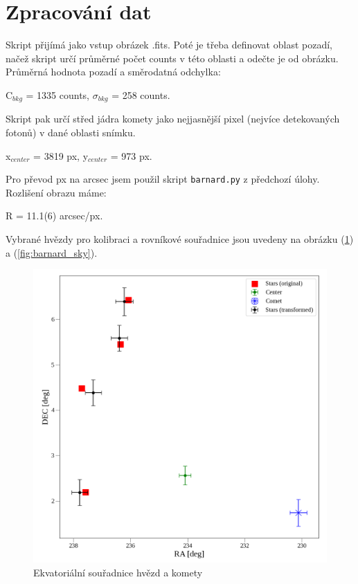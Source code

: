 \documentclass[a4paper,11pt]{article}
\begin{document}
    \begin{minipage}[t]{0.5\textwidth} 
        \section{Zpracování dat} 
            Skript přijímá jako vstup obrázek .fits. Poté je třeba definovat oblast pozadí, načež skript určí průměrné počet counts v této oblasti a odečte je od obrázku. Průměrná hodnota pozadí a směrodatná odchylka: 
            \begin{center}
                C$_{bkg}$ = 1335 counts, $\sigma_{bkg}$ = 258 counts.
            \end{center}
            \par Skript pak určí střed jádra komety jako nejjasnější pixel (nejvíce detekovaných fotonů) v dané oblasti snímku.
            \begin{center}
                x$_{center}$ = 3819 px, y$_{center}$ = 973 px.
            \end{center}
            \par Pro převod px na arcsec jsem použil skript \texttt{barnard.py} z předchozí úlohy. Rozlišení obrazu máme:
            \begin{center}
                R = 11.1(6) arcsec/px.
            \end{center}
            Vybrané hvězdy pro kolibraci a rovníkové souřadnice jsou uvedeny na obrázku (\ref{fig:barnard_radec}) a (\ref{fig:barnard_sky}).

            \begin{figure}[H]
                \centering
                \includegraphics[scale=0.35]{barnard_radec}
                \captionsetup{justification=centering, font=footnotesize}
                \caption{Ekvatoriální souřadnice hvězd a komety}
                \label{fig:barnard_radec}
            \end{figure}
    \end{minipage}
\end{document}
